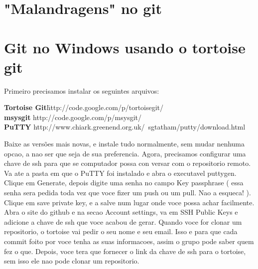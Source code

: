 \documentclass{article}
\begin{document}
\section{"Malandragens" no git}


\section{Git no Windows usando o tortoise git}
    Primeiro precisamos instalar os seguintes arquivos:
    \begin{tabbing}
        \hspace{1cm}\=\textbf{Tortoise Git}\quad    \=http://code.google.com/p/tortoisegit/\\
                    \>\textbf{msysgit}              \>http://code.google.com/p/msysgit/\\
                    \>\textbf{PuTTY}                \>http://www.chiark.greenend.org.uk/~sgtatham/putty/download.html
    \end{tabbing}
Baixe as versões mais novas, e instale tudo normalmente, sem mudar nenhuma opcao,
a nao ser que seja de sua preferencia.
Agora, precisamos configurar uma chave de ssh para que se computador possa con
versar com o repositorio remoto. Va ate a pasta em que o PuTTY foi instalado e 
abra o executavel puttygen. Clique em Generate, depois digite uma senha no campo
Key passphrase ( essa senha sera pedida toda vez que voce fizer um push ou um 
pull. Nao a esqueca! ). Clique em save private key, e a salve num lugar onde 
voce possa achar facilmente. Abra o site do github e na secao Account settings,
va em SSH Public Keys e adicione a chave de ssh que voce acabou de gerar.
Quando voce for clonar um repositorio, o tortoise vai pedir o seu nome e seu email.
Isso e para que cada commit foito por voce tenha as suas informacoes, assim
o grupo pode saber quem fez o que. Depois, voce tera que fornecer o link da chave 
de ssh para o tortoise, sem isso ele nao pode clonar um repositorio.
\end{document}
